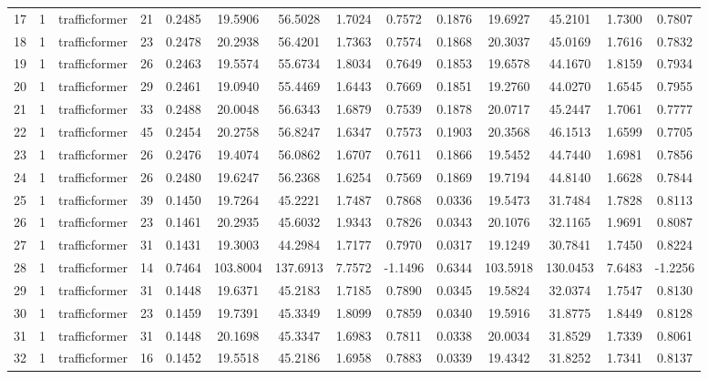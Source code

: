 \begin{landscape}
\begin{longtable}{c c c c c c c c c c c c c c}
	17 & 1 & trafficformer & 21 & 0.2485 & 19.5906 & 56.5028 & 1.7024 & 0.7572 & 0.1876 & 19.6927 & 45.2101 & 1.7300 & 0.7807 \\
	18 & 1 & trafficformer & 23 & 0.2478 & 20.2938 & 56.4201 & 1.7363 & 0.7574 & 0.1868 & 20.3037 & 45.0169 & 1.7616 & 0.7832 \\
	19 & 1 & trafficformer & 26 & 0.2463 & 19.5574 & 55.6734 & 1.8034 & 0.7649 & 0.1853 & 19.6578 & 44.1670 & 1.8159 & 0.7934 \\
	20 & 1 & trafficformer & 29 & 0.2461 & 19.0940 & 55.4469 & 1.6443 & 0.7669 & 0.1851 & 19.2760 & 44.0270 & 1.6545 & 0.7955 \\
	21 & 1 & trafficformer & 33 & 0.2488 & 20.0048 & 56.6343 & 1.6879 & 0.7539 & 0.1878 & 20.0717 & 45.2447 & 1.7061 & 0.7777 \\
	22 & 1 & trafficformer & 45 & 0.2454 & 20.2758 & 56.8247 & 1.6347 & 0.7573 & 0.1903 & 20.3568 & 46.1513 & 1.6599 & 0.7705 \\
	23 & 1 & trafficformer & 26 & 0.2476 & 19.4074 & 56.0862 & 1.6707 & 0.7611 & 0.1866 & 19.5452 & 44.7440 & 1.6981 & 0.7856 \\
	24 & 1 & trafficformer & 26 & 0.2480 & 19.6247 & 56.2368 & 1.6254 & 0.7569 & 0.1869 & 19.7194 & 44.8140 & 1.6628 & 0.7844 \\
	25 & 1 & trafficformer & 39 & 0.1450 & 19.7264 & 45.2221 & 1.7487 & 0.7868 & 0.0336 & 19.5473 & 31.7484 & 1.7828 & 0.8113 \\
	26 & 1 & trafficformer & 23 & 0.1461 & 20.2935 & 45.6032 & 1.9343 & 0.7826 & 0.0343 & 20.1076 & 32.1165 & 1.9691 & 0.8087 \\
	27 & 1 & trafficformer & 31 & 0.1431 & 19.3003 & 44.2984 & 1.7177 & 0.7970 & 0.0317 & 19.1249 & 30.7841 & 1.7450 & 0.8224 \\
	28 & 1 & trafficformer & 14 & 0.7464 & 103.8004 & 137.6913 & 7.7572 & -1.1496 & 0.6344 & 103.5918 & 130.0453 & 7.6483 & -1.2256 \\
	29 & 1 & trafficformer & 31 & 0.1448 & 19.6371 & 45.2183 & 1.7185 & 0.7890 & 0.0345 & 19.5824 & 32.0374 & 1.7547 & 0.8130 \\
	30 & 1 & trafficformer & 23 & 0.1459 & 19.7391 & 45.3349 & 1.8099 & 0.7859 & 0.0340 & 19.5916 & 31.8775 & 1.8449 & 0.8128 \\
	31 & 1 & trafficformer & 31 & 0.1448 & 20.1698 & 45.3347 & 1.6983 & 0.7811 & 0.0338 & 20.0034 & 31.8529 & 1.7339 & 0.8061 \\
	32 & 1 & trafficformer & 16 & 0.1452 & 19.5518 & 45.2186 & 1.6958 & 0.7883 & 0.0339 & 19.4342 & 31.8252 & 1.7341 & 0.8137 \\

\end{longtable}
\end{landscape}
